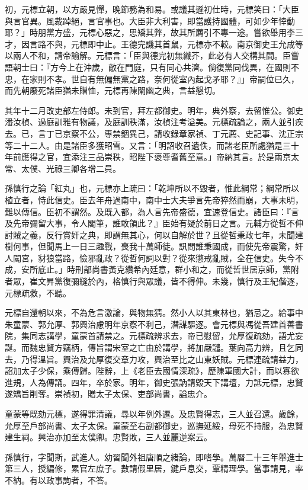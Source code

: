 \begin{pinyinscope}
初，元標立朝，以方嚴見憚，晚節務為和易。或議其遜初仕時，元標笑曰：「大臣與言官異。風裁踔絕，言官事也。大臣非大利害，即當護持國體，可如少年悻動耶？」時朋黨方盛，元標心惡之，思矯其弊，故其所薦引不專一途。嘗欲舉用李三才，因言路不與，元標即中止。王德完譏其首鼠，元標亦不較。南京御史王允成等以兩人不和，請帝諭解。元標言：「臣與德完初無纖芥，此必有人交構其間。臣嘗語朝士曰：『方今上在沖歲，敵在門庭，只有同心共濟。倘復黨同伐異，在國則不忠，在家則不孝。世自有無偏無黨之路，奈何從室內起戈矛耶？』」帝嗣位已久，而先朝廢死諸臣猶未贈恤，元標再陳闡幽之典，言益懇切。

其年十二月改吏部左侍郎。未到官，拜左都御史。明年，典外察，去留惟公。御史潘汝楨、過庭訓雅有物議，及庭訓秩滿，汝楨注考溢美。元標疏論之，兩人並引疾去。已，言丁已京察不公，專禁錮異己，請收錄章家禎、丁元薦、史記事、沈正宗等二十二人。由是諸臣多獲昭雪。又言：「明詔收召遺佚，而諸老臣所處猶是三十年前應得之官，宜添注三品崇秩，昭陛下褒尊耆舊至意。」帝納其言。於是兩京太常、太僕、光祿三卿各增二員。

孫慎行之論「紅丸」也，元標亦上疏曰：「乾坤所以不毀者，惟此綱常；綱常所以植立者，恃此信史。臣去年舟過南中，南中士大夫爭言先帝猝然而崩，大事未明，難以傳信。臣初不謂然。及既入都，為人言先帝盛德，宜速登信史。諸臣曰：『言及先帝彌留大事，令人閣筆，誰敢領此？』臣始有疑於前日之言。元輔方從哲不伸討賊之義，反行賞奸之典，即謂無其心，何以自解於世？且從哲秉政七年，未聞建樹何事，但聞馬上一日三趣戰，喪我十萬師徒。訊問誰秉國成，而使先帝震驚，奸人闖宮，豺狼當路，憸邪亂政？從哲何詞以對？從來懲戒亂賊，全在信史。失今不成，安所底止。」時刑部尚書黃克纘希內廷意，群小和之，而從哲世居京師，黨附者眾，崔文昇黨復彌縫於內，格慎行與眾議，皆不得伸。未幾，慎行及王紀偕逐，元標疏救，不聽。

元標自還朝以來，不為危言激論，與物無猜。然小人以其東林也，猶忌之。給事中朱童蒙、郭允厚、郭興治慮明年京察不利己，潛謀驅逐。會元標與馮從吾建首善書院，集同志講學，童蒙首請禁之。元標疏辨求去，帝已慰留，允厚復疏劾，語尤妄誕。而魏忠賢方竊柄，傳旨謂宋室之亡由於講學，將加嚴譴。葉向高力辨，且乞同去，乃得溫旨。興治及允厚復交章力攻，興治至比之山東妖賊。元標連疏請益力，詔加太子少保，乘傳歸。陛辭，上《老臣去國情深疏》，歷陳軍國大計，而以寡欲進規，人為傳誦。四年，卒於家。明年，御史張訥請毀天下講壇，力詆元標，忠賢遂矯旨削奪。崇禎初，贈太子太保、吏部尚書，謚忠介。

童蒙等既劾元標，遂得罪清議，尋以年例外遷。及忠賢得志，三人並召還。歲餘，允厚至戶部尚書、太子太保。童蒙至右副都御史，巡撫延綏，母死不持服，為忠賢建生祠。興治亦加至太僕卿。忠賢敗，三人並麗逆案云。

孫慎行，字聞斯，武進人。幼習聞外祖唐順之緒論，即嗜學。萬曆二十三年舉進士第三人，授編修，累官左庶子。數請假里居，鍵戶息交，覃精理學。當事請見，率不納。有以政事詢者，不答。


\end{pinyinscope}
